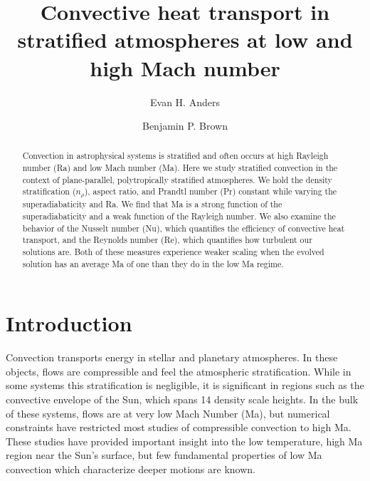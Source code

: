 \documentclass[aps, prl, twocolumn, nofootinbib, groupedaddress, amsfonts, amssymb, amsmath]{revtex4-1}
\newcommand{\RB}{Rayleigh-B\'{e}nard }
\begin{document}
\author{Evan H. Anders}
\author{Benjamin P. Brown}
\title{Convective heat transport in stratified atmospheres at low and high Mach number}

\begin{abstract}
Convection in astrophysical systems is stratified and
often occurs at high Rayleigh number (Ra) and low
Mach number (Ma).
Here we study stratified convection in the context of 
plane-parallel, polytropically stratified atmospheres. 
We hold the density stratification ($n_{\rho}$), aspect
ratio, and Prandtl 
number (Pr) constant while varying the superadiabaticity
and Ra.  We find that Ma is a strong function of the superadiabaticity
and a weak function of the Rayleigh number.
We also examine the behavior of the Nusselt number (Nu), 
which quantifies the efficiency of convective heat transport,
and the Reynolds number (Re), which quantifies how turbulent our
solutions are.  Both of these measures experience weaker scaling when
the evolved solution has an average Ma of one than they do in the
low Ma regime.
\end{abstract}
\maketitle


\section{Introduction}
\label{sec:intro}
Convection transports energy in stellar and planetary atmospheres.
In these objects, flows are compressible and
feel the atmospheric stratification.  While in some systems this stratification 
is negligible, it is significant in regions such as
the convective envelope of the Sun, which spans 14 density scale heights.
In the bulk of these systems, flows are at very low Mach Number (Ma), 
but numerical constraints have restricted most studies of 
compressible convection to high Ma.
These studies have provided important insight into the low temperature, 
high Ma region near the Sun's surface, but few fundamental
properties of low Ma convection which characterize deeper motions
are known.
\end{document}
